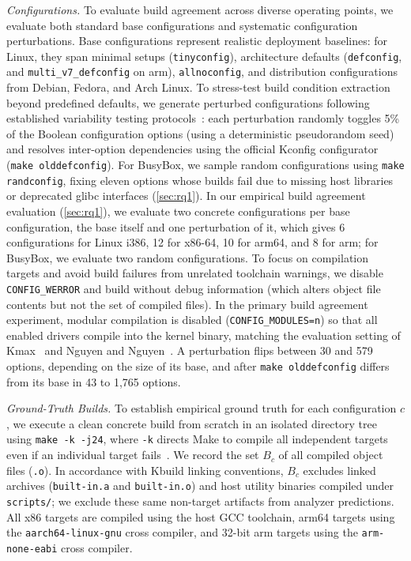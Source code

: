 \documentclass[acmsmall,screen,review,anonymous,nonacm]{acmart}
\begin{document}
\emph{Configurations.}
To evaluate build agreement across diverse operating points, we evaluate both standard base configurations and systematic configuration perturbations.
Base configurations represent realistic deployment baselines: for Linux, they span minimal setups (\texttt{tinyconfig}), architecture defaults (\texttt{defconfig}, and \texttt{multi\_\allowbreak v7\_\allowbreak defconfig} on arm), \texttt{allnoconfig}, and distribution configurations from Debian, Fedora, and Arch Linux.
To stress-test build condition extraction beyond predefined defaults, we generate perturbed configurations following established variability testing protocols~\cite{nguyen2020kbuild,yildiran2024krepair}: each perturbation randomly toggles 5\% of the Boolean configuration options (using a deterministic pseudorandom seed) and resolves inter-option dependencies using the official Kconfig configurator (\texttt{make olddefconfig}).
For BusyBox, we sample random configurations using \texttt{make randconfig}, fixing eleven options whose builds fail due to missing host libraries or deprecated glibc interfaces (\autoref{sec:rq1}).
In our empirical build agreement evaluation (\autoref{sec:rq1}), we evaluate two concrete configurations per base configuration, the base itself and one perturbation of it, which gives 6 configurations for Linux i386, 12 for x86-64, 10 for arm64, and 8 for arm; for BusyBox, we evaluate two random configurations.
To focus on compilation targets and avoid build failures from unrelated toolchain warnings, we disable \texttt{CONFIG\_WERROR} and build without debug information (which alters object file contents but not the set of compiled files).
In the primary build agreement experiment, modular compilation is disabled (\texttt{CONFIG\_MODULES=n}) so that all enabled drivers compile into the kernel binary, matching the evaluation setting of Kmax~\cite{gazzillo2017kmax} and Nguyen and Nguyen~\cite{nguyen2020kbuild}.
A perturbation flips between 30 and 579 options, depending on the size of its base, and after \texttt{make olddefconfig} differs from its base in 43 to 1,765 options.

\emph{Ground-Truth Builds.}
To establish empirical ground truth for each configuration $c$, we execute a clean concrete build from scratch in an isolated directory tree using \texttt{make -k -j24}, where \texttt{-k} directs Make to compile all independent targets even if an individual target fails~\cite{nguyen2020kbuild}.
We record the set $B_c$ of all compiled object files (\texttt{.o}).
In accordance with Kbuild linking conventions, $B_c$ excludes linked archives (\texttt{built-in.a} and \texttt{built-in.o}) and host utility binaries compiled under \texttt{scripts/}; we exclude these same non-target artifacts from analyzer predictions.
All x86 targets are compiled using the host GCC toolchain, arm64 targets using the \texttt{aarch64-linux-gnu} cross compiler, and 32-bit arm targets using the \texttt{arm-none-eabi} cross compiler.
\end{document}
